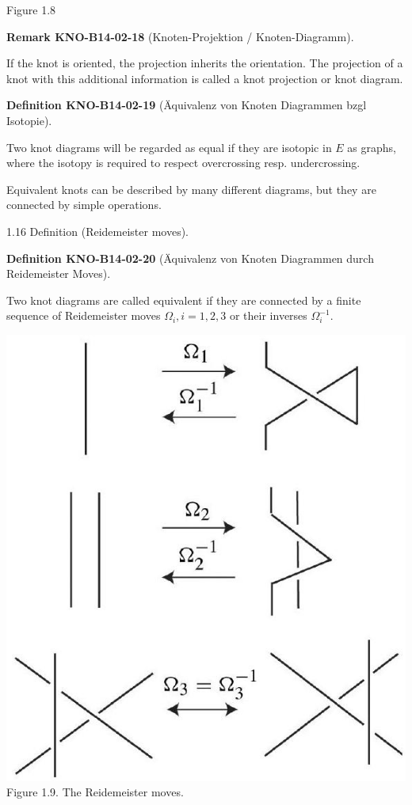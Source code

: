 \documentclass[10pt, letterpaper]{article}
\newcommand{\CustomHeading}[3]{%
  \par\medskip\noindent%
  \textbf{#1 #2} \textnormal{(#3)}.\enskip%
}
\newenvironment{DEF}[2]{\begin{unitbox}\CustomHeading{Definition}{#1}{#2}}{\end{unitbox}}
\newenvironment{REM}[2]{\begin{unitbox}\CustomHeading{Remark}{#1}{#2}}{\end{unitbox}}
\begin{document}
Figure 1.8


\begin{REM}{KNO-B14-02-18}{Knoten-Projektion / Knoten-Diagramm}
If the knot is oriented, the projection inherits the orientation. The projection of a knot with this additional information is called a knot projection or knot diagram.
\end{REM} 

\begin{DEF}{KNO-B14-02-19}{Äquivalenz von Knoten Diagrammen bzgl Isotopie}
Two knot diagrams will be regarded as equal if they are isotopic in $E$ as graphs, where the isotopy is required to respect overcrossing resp. undercrossing.
\end{DEF} 

Equivalent knots can be described by many different diagrams, but they are connected by simple operations.


1.16 Definition (Reidemeister moves). 

\begin{DEF}{KNO-B14-02-20}{Äquivalenz von Knoten Diagrammen durch Reidemeister Moves}
Two knot diagrams are called equivalent if they are connected by a finite sequence of Reidemeister moves $\Omega_{i}, i=1,2,3$ or their inverses $\Omega_{i}^{-1}$.

\includegraphics[scale=0.2, center]{2025_05_21_9c06be8de7a55410f8c1g-025(1)}
Figure 1.9. The Reidemeister moves.
\end{DEF}
\end{document}
